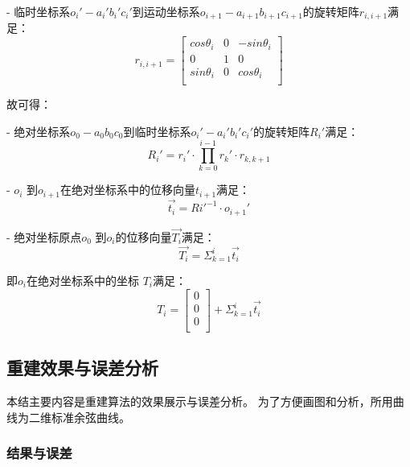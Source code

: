 - 临时坐标系$o_i'-a_i'b_i'c_i'$到运动坐标系$o_{i+1}-a_{i+1}b_{i+1}c_{i+1}$的旋转矩阵$r_{i, i+1}$满足：
    \begin{equation}
    r_{i, i+1} = \left[
      \begin{matrix}
      cos \theta_i & 0 & -sin \theta_i\\
      0 &1 & 0\\
      sin \theta_i & 0 & cos \theta_i\\
      \end{matrix}
    \right]
    \end{equation}

故可得：

- 绝对坐标系$o_0-a_0b_0c_0$到临时坐标系$o_i'-a_i'b_i'c_i'$的旋转矩阵$R_i'$满足：
    \begin{equation}
    R_i' = r_i' \cdot \prod_{k = 0}^{i-1} r_k' \cdot r_{k, k+1}
    \end{equation}
    
- $o_i$ 到$o_{i+1}$在绝对坐标系中的位移向量$t_{i+1}$满足：
    \begin{equation}
    \vec{t_i} = Ri'^{-1}\cdot o_{i+1}'
    \end{equation}

- 绝对坐标原点$o_0$ 到$o_i$的位移向量$\vec{T_i}$满足：
    \begin{equation}
    \vec{T_i} = \Sigma_{k=1} ^ {i} \vec{t_i}
    \end{equation}

即$o_i$在绝对坐标系中的坐标 $T_i$满足\cite{用于光纤光栅曲线重建算法的坐标点拟合}：
\begin{equation}
T_i = \left[
    \begin{matrix}
    0\\
    0\\
    0\\
  	\end{matrix}
  \right]
  + \Sigma_{k=1} ^ {i} \vec{t_i}
\end{equation}

\subsection{重建效果与误差分析}

本结主要内容是重建算法的效果展示与误差分析。
为了方便画图和分析，所用曲线为二维标准余弦曲线。

\subsubsection{结果与误差}

